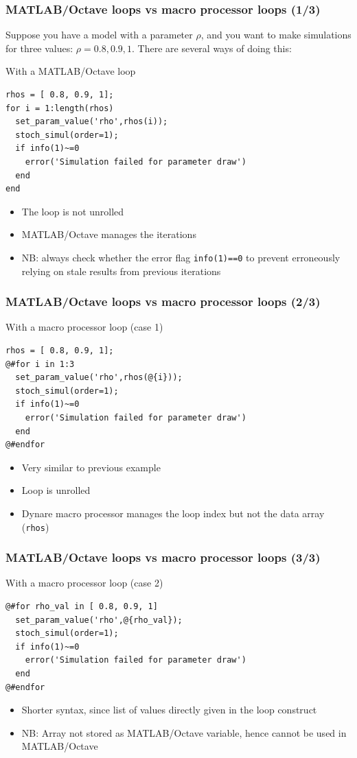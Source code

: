 \documentclass[aspectratio=169]{beamer}
\begin{document}
\begin{frame}[fragile=singleslide]
  \frametitle{MATLAB/Octave loops vs macro processor loops (1/3)}
  Suppose you have a model with a parameter $\rho$, and you want to make
  simulations for three values: $\rho = 0.8, 0.9, 1$. There are
  several ways of doing this:
  \begin{block}{With a MATLAB/Octave loop}
\begin{verbatim}
rhos = [ 0.8, 0.9, 1];
for i = 1:length(rhos)
  set_param_value('rho',rhos(i));
  stoch_simul(order=1);
  if info(1)~=0
    error('Simulation failed for parameter draw')
  end
end
\end{verbatim}
  \end{block}
  \begin{itemize}
  \item The loop is not unrolled
  \item MATLAB/Octave manages the iterations
  \item NB: always check whether the error flag \texttt{info(1)==0} to prevent erroneously relying on stale results from previous iterations
  \end{itemize}
\end{frame}

\begin{frame}[fragile=singleslide]
  \frametitle{MATLAB/Octave loops vs macro processor loops (2/3)}
  \begin{block}{With a macro processor loop (case 1)}
\begin{verbatim}
rhos = [ 0.8, 0.9, 1];
@#for i in 1:3
  set_param_value('rho',rhos(@{i}));
  stoch_simul(order=1);
  if info(1)~=0
    error('Simulation failed for parameter draw')
  end
@#endfor
\end{verbatim}
  \end{block}
  \begin{itemize}
  \item Very similar to previous example
  \item Loop is unrolled
  \item Dynare macro processor manages the loop index but not the data array (\texttt{rhos})
  \end{itemize}
\end{frame}

\begin{frame}[fragile=singleslide]
  \frametitle{MATLAB/Octave loops vs macro processor loops (3/3)}
  \begin{block}{With a macro processor loop (case 2)}
\begin{verbatim}
@#for rho_val in [ 0.8, 0.9, 1]
  set_param_value('rho',@{rho_val});
  stoch_simul(order=1);
  if info(1)~=0
    error('Simulation failed for parameter draw')
  end
@#endfor
\end{verbatim}
  \end{block}
  \begin{itemize}
  \item Shorter syntax, since list of values directly given in the loop construct
  \item NB: Array not stored as MATLAB/Octave variable, hence cannot be used in MATLAB/Octave
  \end{itemize}
\end{frame}
\end{document}
